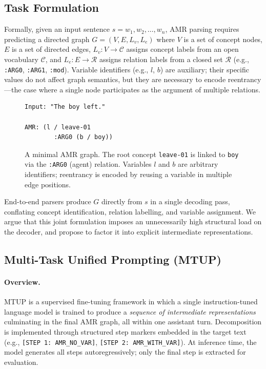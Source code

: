 \subsection{Task Formulation}
\label{sec:task}

Formally, given an input sentence $s = w_1, w_2, \ldots, w_n$, AMR parsing
requires predicting a directed graph $G = (V, E, L_v, L_e)$ where $V$ is a
set of concept nodes, $E$ is a set of directed edges, $L_v : V \to \mathcal{C}$
assigns concept labels from an open vocabulary $\mathcal{C}$, and
$L_e : E \to \mathcal{R}$ assigns relation labels from a closed set $\mathcal{R}$
(e.g., \texttt{:ARG0}, \texttt{:ARG1}, \texttt{:mod}). Variable identifiers
(e.g., $l$, $b$) are auxiliary; their specific values do not affect graph
semantics, but they are necessary to encode reentrancy---the case where a single
node participates as the argument of multiple relations.

\begin{figure}[h]
\begin{lstlisting}[style=amrstyle, basicstyle=\small\ttfamily]
Input: "The boy left."

AMR: (l / leave-01
        :ARG0 (b / boy))
\end{lstlisting}
\caption{A minimal AMR graph. The root concept \texttt{leave-01} is linked
to \texttt{boy} via the \texttt{:ARG0} (agent) relation. Variables $l$ and
$b$ are arbitrary identifiers; reentrancy is encoded by reusing a variable in
multiple edge positions.}
\label{fig:amr-example}
\end{figure}

End-to-end parsers produce $G$ directly from $s$ in a single decoding pass,
conflating concept identification, relation labelling, and variable assignment.
We argue that this joint formulation imposes an unnecessarily high structural
load on the decoder, and propose to factor it into explicit intermediate
representations.

\subsection{Multi-Task Unified Prompting (MTUP)}
\label{sec:mtup}

\paragraph{Overview.}
MTUP is a supervised fine-tuning framework in which a single instruction-tuned
language model is trained to produce a \emph{sequence of intermediate
representations} culminating in the final AMR graph, all within one assistant
turn. Decomposition is implemented through structured step markers embedded in
the target text (e.g., \texttt{[STEP 1: AMR\_NO\_VAR]},
\texttt{[STEP 2: AMR\_WITH\_VAR]}). At inference time, the model generates
all steps autoregressively; only the final step is extracted for evaluation.

